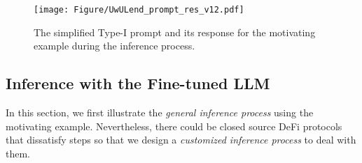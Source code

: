 



\begin{figure*}
    \centering
    \texttt{[image: Figure/UwULend\_prompt\_res\_v12.pdf]}
    \vspace{-2ex}
    \caption{The simplified Type-I prompt and its response for the motivating example during the inference process.}
    \label{fig:moti_prom_res}
\end{figure*}


\subsection{Inference with the Fine-tuned LLM}
\label{sec:inference}

In this section, we first illustrate the \emph{general inference process} using the motivating example.
Nevertheless, there could be closed source DeFi protocols that dissatisfy steps  so that we design a \emph{customized inference process} to deal with them.


